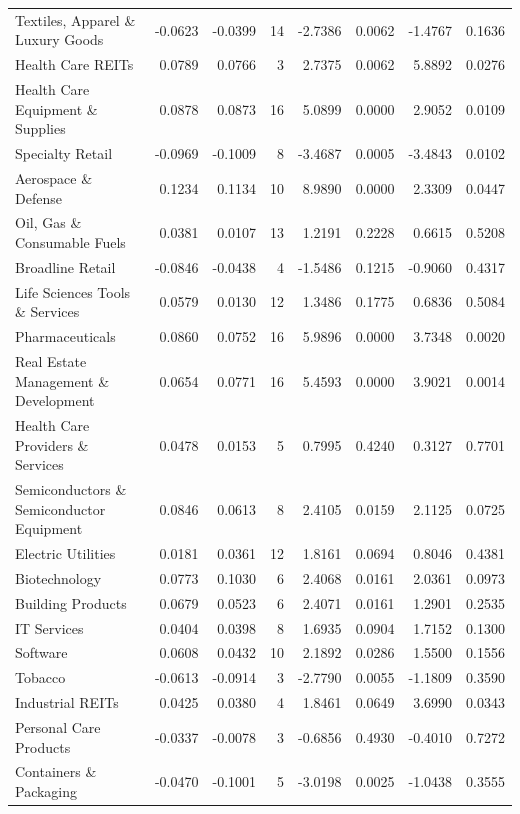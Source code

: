 \begin{table}
\begin{tabular}{lrrrrrrr}
Textiles, Apparel \& Luxury Goods & -0.0623 & -0.0399 & 14 & -2.7386 & 0.0062 & -1.4767 & 0.1636 \\
Health Care REITs & 0.0789 & 0.0766 & 3 & 2.7375 & 0.0062 & 5.8892 & 0.0276 \\
Health Care Equipment \& Supplies & 0.0878 & 0.0873 & 16 & 5.0899 & 0.0000 & 2.9052 & 0.0109 \\
Specialty Retail & -0.0969 & -0.1009 & 8 & -3.4687 & 0.0005 & -3.4843 & 0.0102 \\
Aerospace \& Defense & 0.1234 & 0.1134 & 10 & 8.9890 & 0.0000 & 2.3309 & 0.0447 \\
Oil, Gas \& Consumable Fuels & 0.0381 & 0.0107 & 13 & 1.2191 & 0.2228 & 0.6615 & 0.5208 \\
Broadline Retail & -0.0846 & -0.0438 & 4 & -1.5486 & 0.1215 & -0.9060 & 0.4317 \\
Life Sciences Tools \& Services & 0.0579 & 0.0130 & 12 & 1.3486 & 0.1775 & 0.6836 & 0.5084 \\
Pharmaceuticals & 0.0860 & 0.0752 & 16 & 5.9896 & 0.0000 & 3.7348 & 0.0020 \\
Real Estate Management \& Development & 0.0654 & 0.0771 & 16 & 5.4593 & 0.0000 & 3.9021 & 0.0014 \\
Health Care Providers \& Services & 0.0478 & 0.0153 & 5 & 0.7995 & 0.4240 & 0.3127 & 0.7701 \\
Semiconductors \& Semiconductor Equipment & 0.0846 & 0.0613 & 8 & 2.4105 & 0.0159 & 2.1125 & 0.0725 \\
Electric Utilities & 0.0181 & 0.0361 & 12 & 1.8161 & 0.0694 & 0.8046 & 0.4381 \\
Biotechnology & 0.0773 & 0.1030 & 6 & 2.4068 & 0.0161 & 2.0361 & 0.0973 \\
Building Products & 0.0679 & 0.0523 & 6 & 2.4071 & 0.0161 & 1.2901 & 0.2535 \\
IT Services & 0.0404 & 0.0398 & 8 & 1.6935 & 0.0904 & 1.7152 & 0.1300 \\
Software & 0.0608 & 0.0432 & 10 & 2.1892 & 0.0286 & 1.5500 & 0.1556 \\
Tobacco & -0.0613 & -0.0914 & 3 & -2.7790 & 0.0055 & -1.1809 & 0.3590 \\
Industrial REITs & 0.0425 & 0.0380 & 4 & 1.8461 & 0.0649 & 3.6990 & 0.0343 \\
Personal Care Products & -0.0337 & -0.0078 & 3 & -0.6856 & 0.4930 & -0.4010 & 0.7272 \\
Containers \& Packaging & -0.0470 & -0.1001 & 5 & -3.0198 & 0.0025 & -1.0438 & 0.3555 \\

\end{tabular}
\end{table}
